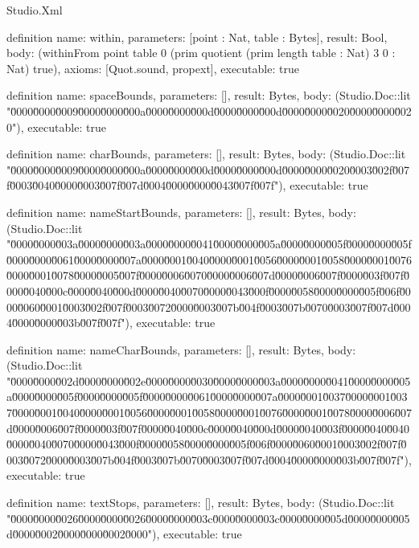 \begin{lexlean}{Studio.Xml}
\begin{semanticmodule}
definition{
  name: within,
  parameters: [point : Nat, table : Bytes],
  result: Bool,
  body: (withinFrom point table 0 (prim quotient (prim length table : Nat) 3 0 : Nat) true),
  axioms: [Quot.sound, propext],
  executable: true
}

definition{
  name: spaceBounds,
  parameters: [],
  result: Bytes,
  body: (Studio.Doc::lit "\u0000\u0000\u0009\u0000\u0000\u000a\u0000\u0000\u000d\u0000\u0000\u000d\u0000\u0000\u0020\u0000\u0000\u0020"),
  executable: true
}

definition{
  name: charBounds,
  parameters: [],
  result: Bytes,
  body: (Studio.Doc::lit "\u0000\u0000\u0009\u0000\u0000\u000a\u0000\u0000\u000d\u0000\u0000\u000d\u0000\u0000\u0020\u0003\u002f\u007f\u0003\u0040\u0000\u0003\u007f\u007d\u0004\u0000\u0000\u0043\u007f\u007f"),
  executable: true
}

definition{
  name: nameStartBounds,
  parameters: [],
  result: Bytes,
  body: (Studio.Doc::lit "\u0000\u0000\u003a\u0000\u0000\u003a\u0000\u0000\u0041\u0000\u0000\u005a\u0000\u0000\u005f\u0000\u0000\u005f\u0000\u0000\u0061\u0000\u0000\u007a\u0000\u0001\u0040\u0000\u0001\u0056\u0000\u0001\u0058\u0000\u0001\u0076\u0000\u0001\u0078\u0000\u0005\u007f\u0000\u0006\u0070\u0000\u0006\u007d\u0000\u0006\u007f\u0000\u003f\u007f\u0000\u0040\u000c\u0000\u0040\u000d\u0000\u0040\u0070\u0000\u0043\u000f\u0000\u0058\u0000\u0000\u005f\u006f\u0000\u0060\u0001\u0003\u002f\u007f\u0003\u0072\u0000\u0003\u007b\u004f\u0003\u007b\u0070\u0003\u007f\u007d\u0004\u0000\u0000\u003b\u007f\u007f"),
  executable: true
}

definition{
  name: nameCharBounds,
  parameters: [],
  result: Bytes,
  body: (Studio.Doc::lit "\u0000\u0000\u002d\u0000\u0000\u002e\u0000\u0000\u0030\u0000\u0000\u003a\u0000\u0000\u0041\u0000\u0000\u005a\u0000\u0000\u005f\u0000\u0000\u005f\u0000\u0000\u0061\u0000\u0000\u007a\u0000\u0001\u0037\u0000\u0001\u0037\u0000\u0001\u0040\u0000\u0001\u0056\u0000\u0001\u0058\u0000\u0001\u0076\u0000\u0001\u0078\u0000\u0006\u007d\u0000\u0006\u007f\u0000\u003f\u007f\u0000\u0040\u000c\u0000\u0040\u000d\u0000\u0040\u003f\u0000\u0040\u0040\u0000\u0040\u0070\u0000\u0043\u000f\u0000\u0058\u0000\u0000\u005f\u006f\u0000\u0060\u0001\u0003\u002f\u007f\u0003\u0072\u0000\u0003\u007b\u004f\u0003\u007b\u0070\u0003\u007f\u007d\u0004\u0000\u0000\u003b\u007f\u007f"),
  executable: true
}

definition{
  name: textStops,
  parameters: [],
  result: Bytes,
  body: (Studio.Doc::lit "\u0000\u0000\u0026\u0000\u0000\u0026\u0000\u0000\u003c\u0000\u0000\u003c\u0000\u0000\u005d\u0000\u0000\u005d\u0000\u0002\u0000\u0000\u0002\u0000"),
  executable: true
}


\end{semanticmodule}
\end{lexlean}
